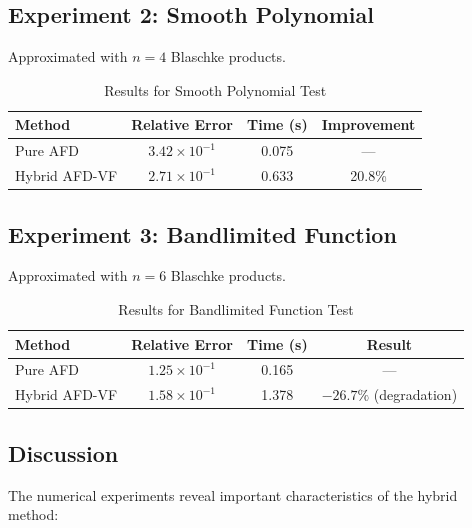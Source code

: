 \documentclass[journal]{IEEEtran}%
\begin{document}
\subsection{Experiment 2: Smooth Polynomial}

Approximated with $n = 4$ Blaschke products.

\begin{table}[h]
\centering
\caption{Results for Smooth Polynomial Test}
\begin{tabular}{lccc}
\toprule
Method & Relative Error & Time (s) & Improvement \\
\midrule
Pure AFD & $3.42 \times 10^{-1}$ & 0.075 & --- \\
Hybrid AFD-VF & $2.71 \times 10^{-1}$ & 0.633 & 20.8\% \\
\bottomrule
\end{tabular}
\end{table}

\subsection{Experiment 3: Bandlimited Function}

Approximated with $n = 6$ Blaschke products.

\begin{table}[h]
\centering
\caption{Results for Bandlimited Function Test}
\begin{tabular}{lccc}
\toprule
Method & Relative Error & Time (s) & Result \\
\midrule
Pure AFD & $1.25 \times 10^{-1}$ & 0.165 & --- \\
Hybrid AFD-VF & $1.58 \times 10^{-1}$ & 1.378 & $-26.7\%$ (degradation) \\
\bottomrule
\end{tabular}
\end{table}

\subsection{Discussion}

The numerical experiments reveal important characteristics of the hybrid method:
\end{document}
